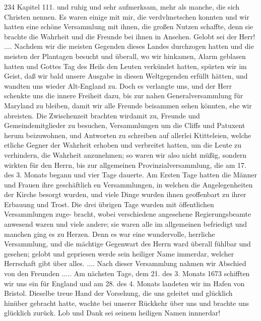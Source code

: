 234 Kapitel 111.
und ruhig und sehr aufmerksam, mehr als manche, die sich Christen
nennen. Es waren einige mit mir, die verdvlmetschen konnten
und wir hatten eine schöne Versammlung mit ihnen, die großen
Nutzen schaffte, denn sie brachte die Wahrheit und die Freunde
bei ihnen in Ansehen. Gelobt sei der Herr! ....
Nachdem wir die meisten Gegenden dieses Landes durchzogen
hatten und die meisten der Plantagen besucht und überall, wo wir
hinkamen, Alarm geblasen hatten und Gottes Tag des Heils
den Leuten verkündet hatten, spürten wir im Geist, daß wir
bald unsere Ausgabe in diesen Weltgegenden erfüllt hätten, und
wandten uns wieder Alt-England zu. Doch es verlangte uns,
und der Herr schenkte uns die innere Freiheit dazu, bis zur
nahen Generalversammlung für Maryland zu bleiben, damit wir
alle Freunde beisammen sehen könnten, ehe wir abreisten. Die
Zwischenzeit brachten wirdamit zu, Freunde und Gemeindemitglieder
zu besuchen, Versammlungen um die Cliffs und Patuxent herum
beizuwohnen, und Antworten zu schreiben auf allerlei Ktitteleien,
welche etliche Gegner der Wahrheit erhoben und verbreitet hatten,
um die Leute zu verhindern, die Wahrheit anzunehmen; so waren
wir also nicht müßig, sondern wirkten für den Herrn, bis zur
allgemeinen Provinzialversammlung, die am 17. des 3. Monats
begann und vier Tage dauerte. Am Ersten Tage hatten die
Männer und Frauen ihre geschäftlich en Versammlungen, in welchen
die Angelegenheiten der Kirche besorgt wurden, und viele Dinge
wurden ihnen geoffenbart zu ihrer Erbauung und Trost. Die
drei übrigen Tage wurden mit öffentlichen Versammlungen zuge-
bracht, wobei verschiedene angesehene Regierungsbeamte anwesend
waren und viele andere; sie waren alle im allgemeinen befriedigt
und manchen ging es zu Herzen. Denn es war eine wundervolle,
herrliche Versammlung, und die mächtige Gegenwart des Herrn
ward überall fühlbar und gesehen; gelobt und gepriesen werde
sein heiliger Name immerdar, welcher Herrschaft gibt über alles.
.... Nach dieser Versammlung nahmen wir Abschied von den
Freunden ..... Am nächsten Tage, dem 21. des 3. Monats
1673 schifften wir uns ein für England und am 28. des 4. Monats
landeten wir im Hafen von Bristol. Dieselbe treue Hand der
Vorsehung, die uns geleitet und glücklich hinüber gebracht hatte,
wachte bei unserer Rückkehr über uns und brachte uns glücklich
zurück. Lob und Dank sei seinem heiligen Namen innnerdar!


